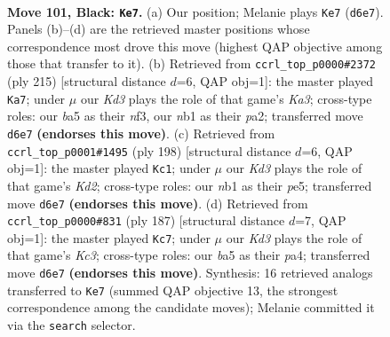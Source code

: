 \documentclass[11pt]{article}
\begin{document}
\clearpage

\begin{figure}[p]\centering
\begin{subfigure}{0.46\textwidth}\centering
\resizebox{\linewidth}{!}{%
\newchessgame
\chessboard[
  setfen={8/8/3k4/B7/p1p3b1/8/5K2/1N6 b - - 57 101},
  showmover=false,
  pgfstyle=straightmove, color=movearrow, markmove={d6-e7}
]}
\caption{}
\end{subfigure}\hfill
\begin{subfigure}{0.46\textwidth}\centering
\resizebox{\linewidth}{!}{%
\newchessgame
\chessboard[
  setfen={8/6b1/k7/8/2K5/p4N2/P7/8 b - - 73 108},
  showmover=false,
  pgfstyle=straightmove, color=movearrow, markmove={a6-a7}
]}
\caption{}
\end{subfigure}
\\[4pt]
\begin{subfigure}{0.46\textwidth}\centering
\resizebox{\linewidth}{!}{%
\newchessgame
\chessboard[
  setfen={4k3/8/8/4p3/8/5P2/B2K4/6b1 w - - 21 100},
  showmover=false,
  pgfstyle=straightmove, color=movearrow, markmove={d2-c1}
]}
\caption{}
\end{subfigure}\hfill
\begin{subfigure}{0.46\textwidth}\centering
\resizebox{\linewidth}{!}{%
\newchessgame
\chessboard[
  setfen={8/8/2k5/p7/P2K4/8/4p3/4N3 b - - 55 94},
  showmover=false,
  pgfstyle=straightmove, color=movearrow, markmove={c6-c7}
]}
\caption{}
\end{subfigure}
\caption{\textbf{Move 101, Black: \texttt{Ke7}.} (a) Our position; Melanie plays \texttt{Ke7} (\texttt{d6e7}). Panels (b)--(d) are the retrieved master positions whose correspondence most drove this move (highest QAP objective among those that transfer to it). (b) Retrieved from \texttt{ccrl\_top\_p0000\#2372} (ply 215) [structural distance $d$=6, QAP obj=1]: the master played \texttt{Ka7}; under $\mu$ our \emph{Kd3} plays the role of that game's \emph{Ka3}; cross-type roles: our \emph{b}a5 as their \emph{n}f3, our \emph{n}b1 as their \emph{p}a2; transferred move \texttt{d6e7} \textbf{(endorses this move)}. (c) Retrieved from \texttt{ccrl\_top\_p0001\#1495} (ply 198) [structural distance $d$=6, QAP obj=1]: the master played \texttt{Kc1}; under $\mu$ our \emph{Kd3} plays the role of that game's \emph{Kd2}; cross-type roles: our \emph{n}b1 as their \emph{p}e5; transferred move \texttt{d6e7} \textbf{(endorses this move)}. (d) Retrieved from \texttt{ccrl\_top\_p0000\#831} (ply 187) [structural distance $d$=7, QAP obj=1]: the master played \texttt{Kc7}; under $\mu$ our \emph{Kd3} plays the role of that game's \emph{Kc3}; cross-type roles: our \emph{b}a5 as their \emph{p}a4; transferred move \texttt{d6e7} \textbf{(endorses this move)}. Synthesis: 16 retrieved analogs transferred to \texttt{Ke7} (summed QAP objective 13, the strongest correspondence among the candidate moves); Melanie committed it via the \texttt{search} selector.}
\label{fig:thought-m201}
\end{figure}
\end{document}
